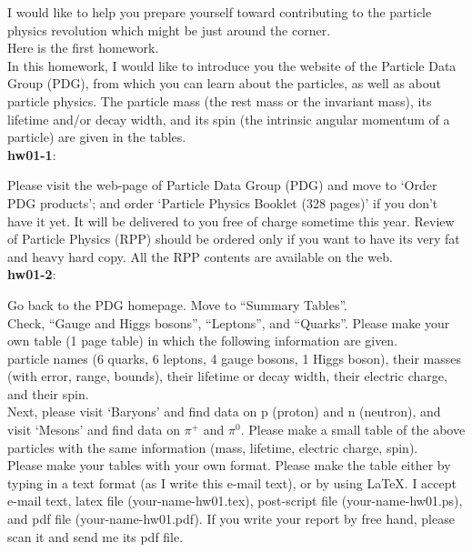  I would like to help you prepare yourself toward
  contributing to the particle physics revolution
  which might be just around the corner.\\

  Here is the first homework.\\

  In this homework, I would like to introduce you the website
  of the Particle Data Group (PDG), from which you can learn
  about the particles, as well as about particle physics.
  The particle mass (the rest mass or the invariant mass),
  its lifetime and/or decay width, and its spin (the intrinsic
  angular momentum of a particle) are given in the tables.\\

{\bf hw01-1}:

  Please visit the web-page of Particle Data Group (PDG)
  and move to `Order PDG products'; and order
  `Particle Physics Booklet (328 pages)' if you don't have it yet.
  It will be delivered to you free of charge sometime this year.
  Review of Particle Physics (RPP) should be ordered only if
  you want to have its very fat and heavy hard copy.  All the
  RPP contents are available on the web.\\

{\bf hw01-2}:

  Go back to the PDG homepage.  Move to ``Summary Tables''.\\

  Check, ``Gauge and Higgs bosons'', ``Leptons'', and ``Quarks''.
  Please make your own table (1 page table) in which
  the following information are given.\\

  particle names (6 quarks, 6 leptons, 4 gauge bosons, 1 Higgs boson),
  their masses (with error, range, bounds), their lifetime or decay
  width, their electric charge, and their spin.\\

  Next, please visit `Baryons' and find data on p (proton) and
  n (neutron), and visit `Mesons' and find data on $\pi^+$ and
  $\pi^0$.  Please make a small table of the above particles with
  the same information (mass, lifetime, electric charge, spin).\\

  Please make your tables with your own format.
  Please make the table either by typing in a text format
  (as I write this e-mail text),
  or by using LaTeX.  I accept e-mail text,
  latex file (your-name-hw01.tex),
  post-script file (your-name-hw01.ps),
  and pdf file (your-name-hw01.pdf).  If you write your report
  by free hand, please scan it and send me its pdf file.\\

